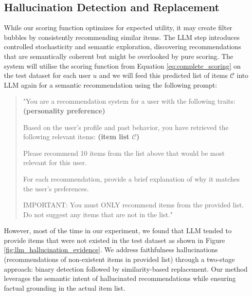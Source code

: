 \documentclass[acmsmall]{acmart}
\begin{document}
\subsection{Hallucination Detection and Replacement}
\label{sec:hallucination_mitigation}
While our scoring function optimizes for expected utility, it may create filter bubbles by consistently recommending similar items. The LLM step introduces controlled stochasticity and semantic exploration, discovering recommendations that are semantically coherent but might be overlooked by pure scoring.
The system will utilise the scoring function from Equation \ref{eq:complete_scoring} on the test dataset for each user $u$ and we will feed this predicted list of items $\mathcal{C}$ into LLM again for a semantic recommendation using the following prompt: 
\begin{quote}
"You are a recommendation system for a user with the following traits:
\textbf{        (personality preference)}
        
        Based on the user's profile and past behavior, you have retrieved the following relevant items:
\textbf{        (item list $\mathcal{C}$)}
        
        Please recommend 10 items from the list above that would be most relevant for this user.
        
        For each recommendation, provide a brief explanation of why it matches the user's preferences.
        
        IMPORTANT: You must ONLY recommend items from the provided list. Do not suggest any items that are not in the list."
\end{quote}
However, most of the time in our experiment, we found that LLM tended to provide items that were not existed in the test dataset as shown in Figure \ref{fig:llm_hallucination_evidence}. We address faithfulness hallucinations (recommendations of non-existent items in provided list) through a two-stage approach: binary detection followed by similarity-based replacement. Our method leverages the semantic intent of hallucinated recommendations while ensuring factual grounding in the actual item list.
\end{document}
